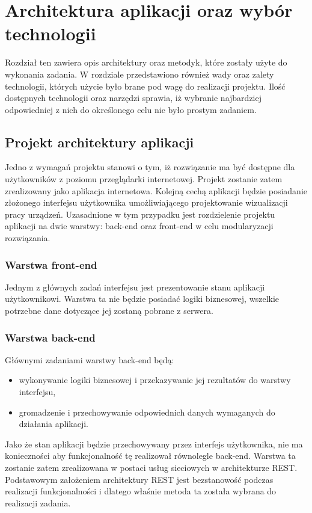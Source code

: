 \chapter{Architektura aplikacji oraz wybór technologii}

Rozdział ten zawiera opis architektury oraz metodyk, które zostały użyte do wykonania zadania. W rozdziale przedstawiono również wady oraz zalety technologii, których użycie było brane pod wagę do realizacji projektu. Ilość dostępnych technologii oraz narzędzi sprawia, iż wybranie najbardziej odpowiedniej z nich do określonego celu nie było prostym zadaniem.

\section{Projekt architektury aplikacji}
Jedno z wymagań projektu stanowi o tym, iż rozwiązanie ma być dostępne dla użytkowników z poziomu przeglądarki internetowej. Projekt zostanie zatem zrealizowany jako aplikacja internetowa. Kolejną cechą aplikacji będzie posiadanie złożonego interfejsu użytkownika umożliwiającego projektowanie wizualizacji pracy urządzeń. Uzasadnione w tym przypadku jest rozdzielenie projektu aplikacji na dwie warstwy: back-end oraz front-end w celu modularyzacji rozwiązania. 

\subsection{Warstwa front-end}
Jednym z głównych zadań interfejsu jest prezentowanie stanu aplikacji użytkownikowi. Warstwa ta nie będzie posiadać logiki biznesowej, wszelkie potrzebne dane dotyczące jej zostaną pobrane z serwera.

\subsection{Warstwa back-end}
Głównymi zadaniami warstwy back-end będą:
\begin{itemize}
\item wykonywanie logiki biznesowej i przekazywanie jej rezultatów do warstwy interfejsu,
\item gromadzenie i przechowywanie odpowiednich danych wymaganych do działania aplikacji.
\end{itemize}

Jako że stan aplikacji będzie przechowywany przez interfejs użytkownika, nie ma konieczności aby funkcjonalność tę realizował równolegle back-end. Warstwa ta zostanie zatem zrealizowana w postaci usług sieciowych w architekturze REST. Podstawowym założeniem architektury REST jest bezstanowość podczas realizacji funkcjonalności\cite{rest-book} i dlatego właśnie metoda ta została wybrana do realizacji zadania.

